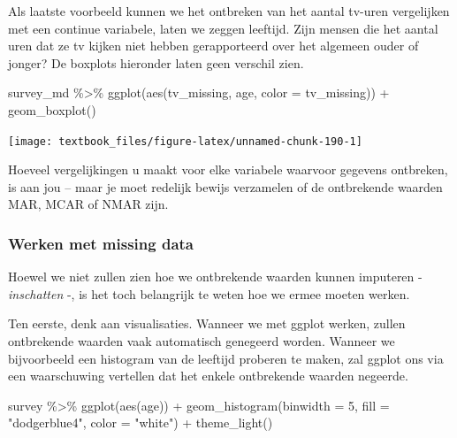 \documentclass[]{tufte-book}
\newenvironment{Shaded}{}{}
\newcommand{\AttributeTok}[1]{\textcolor[rgb]{0.49,0.56,0.16}{#1}}
\newcommand{\DecValTok}[1]{\textcolor[rgb]{0.25,0.63,0.44}{#1}}
\newcommand{\FunctionTok}[1]{\textcolor[rgb]{0.02,0.16,0.49}{#1}}
\newcommand{\NormalTok}[1]{#1}
\newcommand{\SpecialCharTok}[1]{\textcolor[rgb]{0.25,0.44,0.63}{#1}}
\newcommand{\StringTok}[1]{\textcolor[rgb]{0.25,0.44,0.63}{#1}}
\begin{document}
Als laatste voorbeeld kunnen we het ontbreken van het aantal tv-uren vergelijken met een continue variabele, laten we zeggen leeftijd. Zijn mensen die het aantal uren dat ze tv kijken niet hebben gerapporteerd over het algemeen ouder of jonger? De boxplots hieronder laten geen verschil zien.

\begin{Shaded}
\begin{Highlighting}[]
\NormalTok{survey\_md }\SpecialCharTok{\%\textgreater{}\%}
  \FunctionTok{ggplot}\NormalTok{(}\FunctionTok{aes}\NormalTok{(tv\_missing, age, }\AttributeTok{color =}\NormalTok{ tv\_missing)) }\SpecialCharTok{+}
  \FunctionTok{geom\_boxplot}\NormalTok{()}
\end{Highlighting}
\end{Shaded}

\texttt{[image: textbook\_files/figure-latex/unnamed-chunk-190-1]}

Hoeveel vergelijkingen u maakt voor elke variabele waarvoor gegevens ontbreken, is aan jou -- maar je moet redelijk bewijs verzamelen of de ontbrekende waarden MAR, MCAR of NMAR zijn.

\hypertarget{werken-met-missing-data}{%
\subsubsection{Werken met missing data}\label{werken-met-missing-data}}

Hoewel we niet zullen zien hoe we ontbrekende waarden kunnen imputeren - \emph{inschatten} -, is het toch belangrijk te weten hoe we ermee moeten werken.

Ten eerste, denk aan visualisaties. Wanneer we met ggplot werken, zullen ontbrekende waarden vaak automatisch genegeerd worden. Wanneer we bijvoorbeeld een histogram van de leeftijd proberen te maken, zal ggplot ons via een waarschuwing vertellen dat het enkele ontbrekende waarden negeerde.

\begin{Shaded}
\begin{Highlighting}[]
\NormalTok{survey }\SpecialCharTok{\%\textgreater{}\%}
  \FunctionTok{ggplot}\NormalTok{(}\FunctionTok{aes}\NormalTok{(age)) }\SpecialCharTok{+}
  \FunctionTok{geom\_histogram}\NormalTok{(}\AttributeTok{binwidth =} \DecValTok{5}\NormalTok{, }\AttributeTok{fill =} \StringTok{"dodgerblue4"}\NormalTok{, }\AttributeTok{color =} \StringTok{"white"}\NormalTok{) }\SpecialCharTok{+}
  \FunctionTok{theme\_light}\NormalTok{()}
\end{Highlighting}
\end{Shaded}
\end{document}
